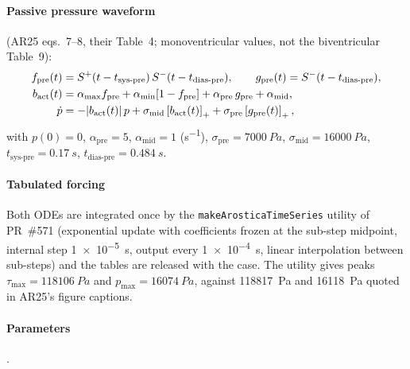 \paragraph{Passive pressure waveform} (AR25 eqs.~7--8, their Table~4;
monoventricular values, not the biventricular Table~9):
\begin{equation}
\begin{aligned}
f_{\mathrm{pre}}(t) &= S^{+}(t-t_{\mathrm{sys\text{-}pre}})\,S^{-}(t-t_{\mathrm{dias\text{-}pre}}),\qquad
g_{\mathrm{pre}}(t) = S^{-}(t-t_{\mathrm{dias\text{-}pre}}),\\
b_{\mathrm{act}}(t) &= \alpha_{\max} f_{\mathrm{pre}} + \alpha_{\min}[1-f_{\mathrm{pre}}]
 + \alpha_{\mathrm{pre}}\,g_{\mathrm{pre}} + \alpha_{\mathrm{mid}},\\
\dot p &= -|b_{\mathrm{act}}(t)|\,p + \sigma_{\mathrm{mid}}\left[b_{\mathrm{act}}(t)\right]_{+}
 + \sigma_{\mathrm{pre}}\left[g_{\mathrm{pre}}(t)\right]_{+},
\end{aligned}
\label{eq:p}
\end{equation}
with $p(0)=0$, $\alpha_{\mathrm{pre}}=5$, $\alpha_{\mathrm{mid}}=1$ (\si{s^{-1}}),
$\sigma_{\mathrm{pre}}=\SI{7000}{Pa}$, $\sigma_{\mathrm{mid}}=\SI{16000}{Pa}$,
$t_{\mathrm{sys\text{-}pre}}=\SI{0.17}{s}$, $t_{\mathrm{dias\text{-}pre}}=\SI{0.484}{s}$.

\paragraph{Tabulated forcing} Both ODEs are integrated once by the
\texttt{makeArosticaTimeSeries} utility of PR~\#571 (exponential update with
coefficients frozen at the sub-step midpoint, internal step \SI{1e-5}{s},
output every \SI{1e-4}{s}, linear interpolation between sub-steps) and the
tables are released with the case. The utility gives peaks
$\tau_{\max}=\SI{118106}{Pa}$ and $p_{\max}=\SI{16074}{Pa}$, against
\SI{118817}{Pa} and \SI{16118}{Pa} quoted in AR25's figure captions.

\paragraph{Parameters} .


